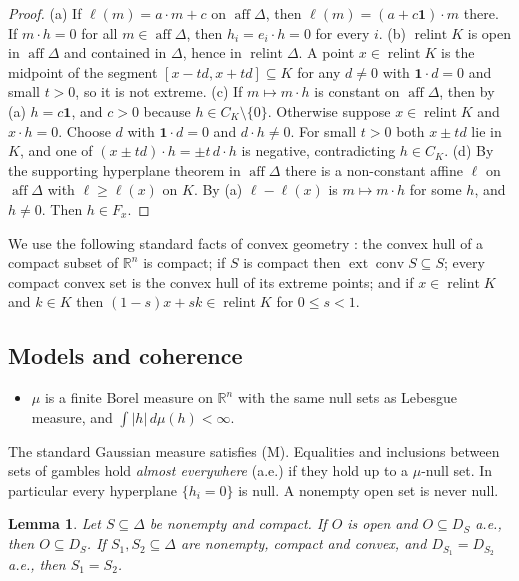 \documentclass[11pt]{article}
\newcommand{\R}{\mathbb{R}}
\newcommand{\one}{\mathbf{1}}
\DeclareMathOperator{\conv}{conv}
\DeclareMathOperator{\relint}{relint}
\DeclareMathOperator{\aff}{aff}
\DeclareMathOperator{\ext}{ext}
\theoremstyle{plain}
\newtheorem{lemma}[theorem]{Lemma}
\theoremstyle{definition}
\theoremstyle{remark}
\begin{document}
\begin{proof}
(a) If $\ell(m)=a\cdot m+c$ on $\aff\Delta$, then $\ell(m)=(a+c\one)\cdot m$ there. If
$m\cdot h=0$ for all $m\in\aff\Delta$, then $h_i=e_i\cdot h=0$ for every $i$.
(b) $\relint K$ is open in $\aff\Delta$ and contained in $\Delta$, hence in $\relint\Delta$.
A point $x\in\relint K$ is the midpoint of the segment $[x-td,x+td]\subseteq K$ for any
$d\neq0$ with $\one\cdot d=0$ and small $t>0$, so it is not extreme.
(c) If $m\mapsto m\cdot h$ is constant on $\aff\Delta$, then by (a) $h=c\one$, and $c>0$
because $h\in C_K\setminus\{0\}$. Otherwise suppose $x\in\relint K$ and $x\cdot h=0$.
Choose $d$ with $\one\cdot d=0$ and $d\cdot h\neq0$. For small $t>0$ both $x\pm td$ lie in
$K$, and one of $(x\pm td)\cdot h=\pm t\,d\cdot h$ is negative, contradicting $h\in C_K$.
(d) By the supporting hyperplane theorem in $\aff\Delta$ \cite[Thm.~11.6]{Rockafellar}
there is a non-constant affine $\ell$ on $\aff\Delta$ with $\ell\ge\ell(x)$ on $K$. By (a)
$\ell-\ell(x)$ is $m\mapsto m\cdot h$ for some $h$, and $h\neq0$. Then $h\in F_x$.
\end{proof}

We use the following standard facts of convex geometry \cite{Rockafellar}: the convex hull
of a compact subset of $\R^n$ is compact; if $S$ is compact then $\ext\conv S\subseteq S$;
every compact convex set is the convex hull of its extreme points; and if $x\in\relint K$
and $k\in K$ then $(1-s)x+sk\in\relint K$ for $0\le s<1$.

\subsection{Models and coherence}

\begin{itemize}
  \item[(M)] $\mu$ is a finite Borel measure on $\R^n$ with the same null sets as Lebesgue
  measure, and $\int|h|\,d\mu(h)<\infty$.
\end{itemize}
The standard Gaussian measure satisfies (M). Equalities and inclusions between sets of
gambles hold \emph{almost everywhere} (a.e.) if they hold up to a $\mu$-null set. In
particular every hyperplane $\{h_i=0\}$ is null. A nonempty open set is never null.

\begin{lemma}\label{lem:open}
Let $S\subseteq\Delta$ be nonempty and compact. If $O$ is open and $O\subseteq D_S$
a.e., then $O\subseteq D_S$. If $S_1,S_2\subseteq\Delta$ are nonempty, compact and
convex, and $D_{S_1}=D_{S_2}$ a.e., then $S_1=S_2$.
\end{lemma}
\end{document}
